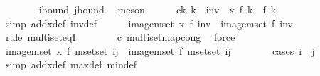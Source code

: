 \begin{isabellebody}
\ \ \ \ \ \ \isamarkupfalse%
\ i{\isacharunderscore}{\kern0pt}bound\ j{\isacharunderscore}{\kern0pt}bound\ \isamarkupfalse%
\ meson\isanewline
\ \ \ \ \isamarkupfalse%
\ c{\isacharcolon}{\kern0pt}{\isachardoublequoteopen}{\isasymAnd}k{\isachardot}{\kern0pt}\ k\ {\isasymin}{\isacharhash}{\kern0pt}\ inv\ {\isasymLongrightarrow}\ {\isacharparenleft}{\kern0pt}x\ f{\isacharparenright}{\kern0pt}\ k\ {\isacharequal}{\kern0pt}\ f\ k{\isachardoublequoteclose}\ \isanewline
\ \ \ \ \ \ \isamarkupfalse%
\ {\isacharparenleft}{\kern0pt}simp\ add{\isacharcolon}{\kern0pt}x{\isacharunderscore}{\kern0pt}def\ inv{\isacharunderscore}{\kern0pt}def{\isacharparenright}{\kern0pt}\isanewline
\ \ \ \ \isamarkupfalse%
\ {\isachardoublequoteopen}image{\isacharunderscore}{\kern0pt}mset\ {\isacharparenleft}{\kern0pt}x\ f{\isacharparenright}{\kern0pt}\ inv\ {\isacharequal}{\kern0pt}\ image{\isacharunderscore}{\kern0pt}mset\ f\ inv{\isachardoublequoteclose}\isanewline
\ \ \ \ \ \ \isamarkupfalse%
\ {\isacharparenleft}{\kern0pt}rule\ multiset{\isacharunderscore}{\kern0pt}eqI{\isacharparenright}{\kern0pt}\isanewline
\ \ \ \ \ \ \isamarkupfalse%
\ c\ multiset{\isachardot}{\kern0pt}map{\isacharunderscore}{\kern0pt}cong{}\ \isamarkupfalse%
\ force\isanewline
\ \ \ \ \isamarkupfalse%
\ \isamarkupfalse%
\ {\isachardoublequoteopen}image{\isacharunderscore}{\kern0pt}mset\ {\isacharparenleft}{\kern0pt}x\ f{\isacharparenright}{\kern0pt}\ {\isacharparenleft}{\kern0pt}mset{\isacharunderscore}{\kern0pt}set\ {\isacharbraceleft}{\kern0pt}i{\isacharcomma}{\kern0pt}j{\isacharbraceright}{\kern0pt}{\isacharparenright}{\kern0pt}\ {\isacharequal}{\kern0pt}\ image{\isacharunderscore}{\kern0pt}mset\ f\ {\isacharparenleft}{\kern0pt}mset{\isacharunderscore}{\kern0pt}set\ {\isacharbraceleft}{\kern0pt}i{\isacharcomma}{\kern0pt}j{\isacharbraceright}{\kern0pt}{\isacharparenright}{\kern0pt}{\isachardoublequoteclose}\isanewline
\ \ \ \ \ \ \isamarkupfalse%
\ {\isacharparenleft}{\kern0pt}cases\ {\isachardoublequoteopen}i\ {\isacharequal}{\kern0pt}\ j{\isachardoublequoteclose}{\isacharparenright}{\kern0pt}\isanewline
\ \ \ \ \ \ \isamarkupfalse%
\ {\isacharparenleft}{\kern0pt}simp\ add{\isacharcolon}{\kern0pt}x{\isacharunderscore}{\kern0pt}def\ max{\isacharunderscore}{\kern0pt}def\ min{\isacharunderscore}{\kern0pt}def{\isacharparenright}{\kern0pt}{\isacharplus}{\kern0pt}\isanewline
\ \ \ \ \isamarkupfalse%

\end{isabellebody}
